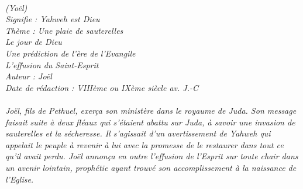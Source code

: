 \BFont
\noindent\hrulefill
\textit{
\bigskip
{\centering{}
\\(Yoël)
\\Signifie : Yahweh est Dieu
\\Thème : Une plaie de sauterelles
\\Le jour de Dieu
\\Une prédiction de l'ère de l'Evangile 
\\L'effusion du Saint-Esprit
\\Auteur : Joël
\\Date de rédaction : VIIIème ou IXème siècle av. J.-C\\}
}
\textit{
\\Joël, fils de Pethuel, exerça son ministère dans le royaume de Juda. Son message faisait suite à deux fléaux qui s’étaient abattu sur Juda, à savoir une invasion de sauterelles et la sécheresse. Il s’agissait d’un avertissement de Yahweh qui appelait le peuple à revenir à lui avec la promesse de le restaurer dans tout ce qu’il avait perdu. Joël annonça en outre l’effusion de l’Esprit sur toute chair dans un avenir lointain, prophétie ayant trouvé son accomplissement à la naissance de l’Eglise.\bigskip
}
\par\nobreak\noindent\hrulefill

